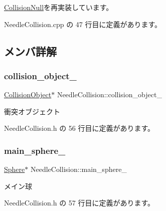 \mbox{\hyperlink{class_collision_null_ad6ac0e9b06fcb4e3d19a5c3c1cadfe7e}{Collision\+Null}}を再実装しています。



 Needle\+Collision.\+cpp の 47 行目に定義があります。



\subsection{メンバ詳解}
\mbox{\label{class_needle_collision_a67e818d495de2f8b7ee623f76c793771}} 
\subsubsection{\texorpdfstring{collision\+\_\+object\+\_\+}{collision\_object\_}}
{\footnotesize\ttfamily \mbox{\hyperlink{class_collision_object}{Collision\+Object}}$\ast$ Needle\+Collision\+::collision\+\_\+object\+\_\+\hspace{0.3cm}{\ttfamily [private]}}



衝突オブジェクト 



 Needle\+Collision.\+h の 56 行目に定義があります。

\mbox{\label{class_needle_collision_ac99f319bdcc48ff3057096ba8b8b8f35}} 
\subsubsection{\texorpdfstring{main\+\_\+sphere\+\_\+}{main\_sphere\_}}
{\footnotesize\ttfamily \mbox{\hyperlink{class_sphere}{Sphere}}$\ast$ Needle\+Collision\+::main\+\_\+sphere\+\_\+\hspace{0.3cm}{\ttfamily [private]}}



メイン球 



 Needle\+Collision.\+h の 57 行目に定義があります。

